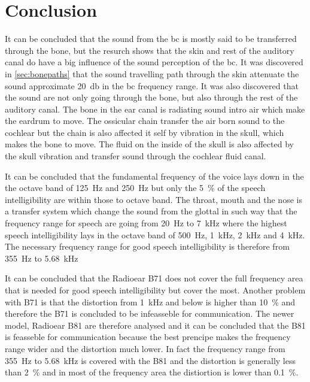 \section{Conclusion}

It can be concluded that the sound from the \gls{bc} is mostly said to be transferred through the bone, but the resurch shows that the skin and rest of the auditory canal do have a big influence of the sound perception of the \gls{bc}. It was discovered in \autoref{sec:bonepaths} that the sound travelling path through the skin attenuate the sound approximate \SI{20}{\decibel} in the \gls{bc} frequency range. It was also discovered that the sound are not only going through the bone, but also through the rest of the auditory canal. The bone in the ear canal is radiating sound intro air which make the eardrum to move. The ossicular chain transfer the air born sound to the cochlear but the chain is also affected it self by vibration in the skull, which makes the bone to move. The fluid on the inside of the skull is also affected by the skull vibration and transfer sound through the cochlear fluid canal.  

It can be concluded that the fundamental frequency of the voice lays down in the the octave band of \SI{125}{\hertz} and \SI{250}{\hertz} but only the \SI{5}{\percent} of the speech intelligibility are within those to octave band. The throat, mouth and the nose is a transfer system which change the sound from the glottal in such way that the frequency range for speech are going from \SI{20}{\hertz} to \SI{7}{\kilo\hertz} where the highest speech intelligibility lays in the octave band of \SI{500}{\hertz}, \SI{1}{\kilo\hertz}, \SI{2}{\kilo\hertz} and \SI{4}{\kilo\hertz}. The necessary frequency range for good speech intelligibility is therefore from \SI{355}{\hertz} to \SI{5.68}{\kilo\hertz}

It can be concluded that the Radioear B71 does not cover the full frequency area that is needed for good speech intelligibility but cover the most. Another problem with B71 is that the distortion from \SI{1}{\kilo\hertz} and below is higher than \SI{10}{\percent} and therefore the B71 is concluded to be infeasseble for communication. The newer model, Radioear B81 are therefore analysed and it can be concluded that the B81 is  feasseble for communication because the \gls{best} prencipe makes the frequency range wider and the distortion much lower. In fact the frequency range from \SI{355}{\hertz} to \SI{5.68}{\kilo\hertz} is covered with the B81 and the distortion is generally less than \SI{2}{\percent} and in most of the frequency area the distiortion is lower than \SI{0.1}{\percent}.